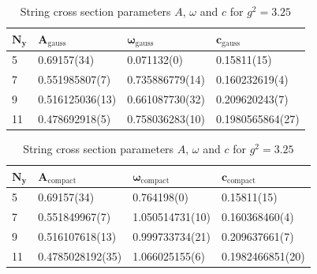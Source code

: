 \begin{table}[!hb]
\centering
\begin{tabular}{llll}
    $\mathbf{N_y}$ & $\mathbf{A_\mathrm{gauss}}$ & $\mathbf{\omega_\mathrm{gauss}}$ & $\mathbf{c_\mathrm{gauss}}$ \\ \hline
   5 & 0.69157(34) & 0.071132(0) & 0.15811(15) \\
   7 & 0.551985807(7) & 0.735886779(14) & 0.160232619(4) \\
   9 & 0.516125036(13) & 0.661087730(32) & 0.209620243(7) \\
   11 & 0.478692918(5) & 0.758036283(10) & 0.1980565864(27) \\
\end{tabular}
\begin{tabular}{llll}
    $\mathbf{N_y}$ & $\mathbf{A_\mathrm{compact}}$ & $\mathbf{\omega_\mathrm{compact}}$ & $\mathbf{c_\mathrm{compact}}$ \\ \hline
   5 & 0.69157(34) & 0.764198(0) & 0.15811(15) \\
   7 & 0.551849967(7) & 1.050514731(10) & 0.160368460(4) \\
   9 & 0.516107618(13) & 0.999733734(21) & 0.209637661(7) \\
   11 & 0.4785028192(35) & 1.066025155(6) & 0.1982466851(20) \\
\end{tabular}
\caption{String cross section parameters $A$, $\omega$ and $c$ for $g^2=3.25$}
\end{table}
